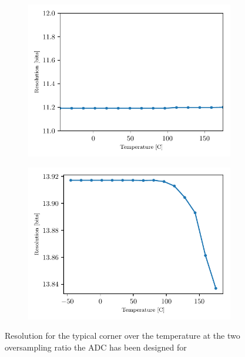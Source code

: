 \begin{figure}[htp]
    \centering
    \begin{subfigure}[b]{0.48\textwidth}
        \includegraphics[width=\textwidth]{Chapter5/Figs/preliminary/adc_real_ota_osr5_temp.pdf}
    \end{subfigure}
    \begin{subfigure}[b]{0.48\textwidth}
        \includegraphics[width=\textwidth]{Chapter5/Figs/preliminary/adc_real_ota_osr6_temp.pdf}
    \end{subfigure}
    \caption{Resolution for the typical corner over the temperature at the two oversampling ratio the ADC has been designed for}
    \label{fig:adc-res-schematic-temp-tt}
\end{figure}

